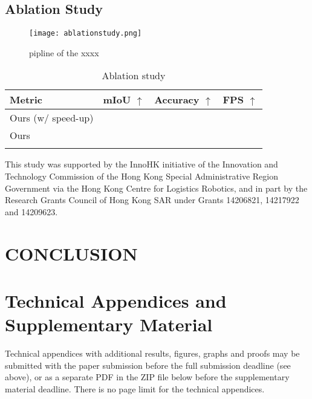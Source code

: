 \documentclass[numbers]{article}
\begin{document}
\subsection{Ablation Study}
\begin{figure}[htbp]
  \centering
  \texttt{[image: ablationstudy.png]} %
  \caption{pipline of the xxxx}
  \label{fig:pipeline} %
\end{figure}
\begin{table}[!htbp]
\centering
\caption{Ablation study}
\renewcommand{\arraystretch}{1.25}
\begin{tabular}{l | c c c}
\Xhline{1.2pt}
Metric & mIoU $\uparrow$  & Accuracy $\uparrow$ & FPS $\uparrow$   \\
\hline
Ours (w/ speed-up) &  &  &  \\
Ours &  &  &   \\
\Xhline{1.2pt}
\end{tabular}
\label{tab:ablation2}
\end{table}


\begin{ack}
This study was supported by the InnoHK initiative of the Innovation and Technology Commission of the Hong Kong Special Administrative Region Government via the Hong Kong Centre for Logistics Robotics, and in part by the Research Grants Council of Hong Kong SAR under Grants 14206821, 14217922 and 14209623.
\end{ack}

\label{sec:exp}

\section{CONCLUSION}

\label{sec:exp}





\appendix

\section{Technical Appendices and Supplementary Material}
Technical appendices with additional results, figures, graphs and proofs may be submitted with the paper submission before the full submission deadline (see above), or as a separate PDF in the ZIP file below before the supplementary material deadline. There is no page limit for the technical appendices.
\end{document}
